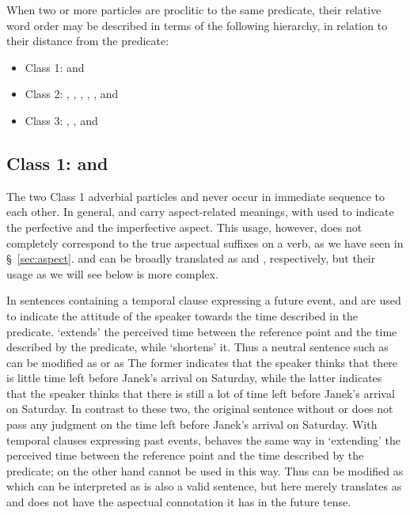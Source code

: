 When two or more particles are proclitic to the same predicate, their relative
word order may be described in terms of the following hierarchy, in relation to
their distance from the predicate:
\begin{itemize}[nosep]
	\item Class 1:  and 
	\item Class 2: , , , , ,  and 
	\item Class 3: , ,  and 
\end{itemize}

\subsection{Class 1:  and }
\label{sec:class1-particles}

The two Class 1 adverbial particles  and  never occur in
immediate sequence to each other. In general,  and  carry
aspect-related meanings, with  used to indicate the perfective and
 the imperfective aspect. This usage, however, does not completely
correspond to the true aspectual suffixes on a verb, as we have seen in
\S~\ref{sec:aspect}.  and  can be broadly translated as
 and , respectively, but their usage as we will
see below is more complex.

In sentences containing a temporal clause expressing a future event, 
and  are used to indicate the attitude of the speaker towards the time
described in the predicate.  `extends' the perceived time between the
reference point and the time described by the predicate, while 
`shortens' it. Thus a neutral sentence such as  can be modified as  or as  The former indicates that the
speaker thinks that there is little time left before Janek's arrival on
Saturday, while the latter indicates that the speaker thinks that there is still
a lot of time left before Janek's arrival on Saturday. In contrast to these two,
the original sentence without  or  does not pass any judgment on
the time left before Janek's arrival on Saturday. With temporal clauses
expressing past events,  behaves the same way in `extending' the
perceived time between the reference point and the time described by the
predicate;  on the other hand cannot be used in this way. Thus
 can be modified as
 which can be interpreted as   is also a valid sentence, but here  merely translates as
 and does not have the aspectual connotation it has in the future
tense.

